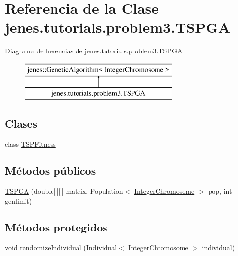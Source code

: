 \hypertarget{classjenes_1_1tutorials_1_1problem3_1_1_t_s_p_g_a}{\section{Referencia de la Clase jenes.\-tutorials.\-problem3.\-T\-S\-P\-G\-A}
\label{classjenes_1_1tutorials_1_1problem3_1_1_t_s_p_g_a}
}
Diagrama de herencias de jenes.\-tutorials.\-problem3.\-T\-S\-P\-G\-A\begin{figure}[H]
\begin{center}
\leavevmode
\includegraphics[height=2.000000cm]{classjenes_1_1tutorials_1_1problem3_1_1_t_s_p_g_a}
\end{center}
\end{figure}
\subsection*{Clases}
\begin{DoxyCompactItemize}
\item 
class \hyperlink{classjenes_1_1tutorials_1_1problem3_1_1_t_s_p_g_a_1_1_t_s_p_fitness}{T\-S\-P\-Fitness}
\end{DoxyCompactItemize}
\subsection*{Métodos públicos}
\begin{DoxyCompactItemize}
\item 
\hyperlink{classjenes_1_1tutorials_1_1problem3_1_1_t_s_p_g_a_aaf0ea88647e26b0bea26bcccee20085a}{T\-S\-P\-G\-A} (double\mbox{[}$\,$\mbox{]}\mbox{[}$\,$\mbox{]} matrix, Population$<$ \hyperlink{classjenes_1_1chromosome_1_1_integer_chromosome}{Integer\-Chromosome} $>$ pop, int genlimit)
\end{DoxyCompactItemize}
\subsection*{Métodos protegidos}
\begin{DoxyCompactItemize}
\item 
void \hyperlink{classjenes_1_1tutorials_1_1problem3_1_1_t_s_p_g_a_a50dfde1c534b9dc5f8df16d4e7512eea}{randomize\-Individual} (Individual$<$ \hyperlink{classjenes_1_1chromosome_1_1_integer_chromosome}{Integer\-Chromosome} $>$ individual)
\end{DoxyCompactItemize}


